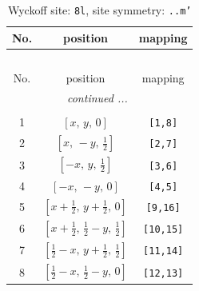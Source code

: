 \documentclass[fleqn,8pt]{jsarticle}
\begin{document}
\begin{longtable}{ccc}
\caption{Wyckoff site: {\tt 8l}, site symmetry: {\tt ..m'}}
 \\
 \hline \hline
No. & position & mapping \\ \hline \endfirsthead

\multicolumn{2}{l}{\tablename\ \thetable{}} \\
 \hline \hline
No. & position & mapping \\ \hline \endhead

 \hline \hline
\multicolumn{2}{r}{\footnotesize\it continued ...} \\ \endfoot

 \hline \hline
\multicolumn{2}{r}{} \\ \endlastfoot

1 & $\left[ x,\, y,\, 0 \right]$ & {\tt [1,8]} \\ \hline
2 & $\left[ x,\, - y,\, \frac{1}{2} \right]$ & {\tt [2,7]} \\ \hline
3 & $\left[ - x,\, y,\, \frac{1}{2} \right]$ & {\tt [3,6]} \\ \hline
4 & $\left[ - x,\, - y,\, 0 \right]$ & {\tt [4,5]} \\ \hline
5 & $\left[ x + \frac{1}{2},\, y + \frac{1}{2},\, 0 \right]$ & {\tt [9,16]} \\ \hline
6 & $\left[ x + \frac{1}{2},\, \frac{1}{2} - y,\, \frac{1}{2} \right]$ & {\tt [10,15]} \\ \hline
7 & $\left[ \frac{1}{2} - x,\, y + \frac{1}{2},\, \frac{1}{2} \right]$ & {\tt [11,14]} \\ \hline
8 & $\left[ \frac{1}{2} - x,\, \frac{1}{2} - y,\, 0 \right]$ & {\tt [12,13]} \\
\end{longtable}
\renewcommand{\arraystretch}{1.2}
\end{document}
